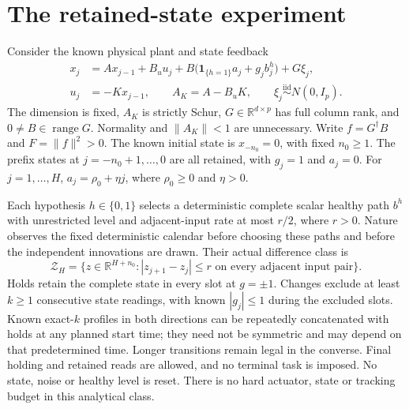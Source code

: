 \section{The retained-state experiment}\label{sf:model}
Consider the known physical plant and state feedback
\begin{equation}\label{sf:plant}
\begin{split}
x_j&=Ax_{j-1}+B_u u_j+B\bigl(\mathbf1_{\{h=1\}}a_j+g_jb_j^h\bigr)+G\xi_j,\\
u_j&=-Kx_{j-1},\qquad A_K=A-B_uK,\qquad
\xi_j\overset{\mathrm{iid}}{\sim}N(0,I_p).
\end{split}
\end{equation}
The dimension is fixed, $A_K$ is strictly Schur, $G\in\mathbb R^{d\times p}$
has full column rank, and $0\ne B\in\operatorname{range}G$.
Normality and $\|A_K\|<1$ are unnecessary. Write
$f=G^\dagger B$ and $F=\|f\|^2>0$. The known initial state is
$x_{-n_0}=0$, with fixed $n_0\ge1$. The prefix states at
$j=-n_0+1,\ldots,0$ are all retained, with $g_j=1$ and $a_j=0$.
For $j=1,\ldots,H$, $a_j=\rho_0+\eta j$, where $\rho_0\ge0$ and $\eta>0$.

Each hypothesis $h\in\{0,1\}$ selects a deterministic complete scalar healthy
path $b^h$ with unrestricted level and adjacent-input rate at most $r/2$,
where $r>0$. Nature observes the fixed deterministic calendar before choosing
these paths and before the independent innovations are drawn. Their actual
difference class is
\begin{equation}\label{sf:path}
\mathcal Z_H=\{z\in\mathbb R^{H+n_0}:|z_{j+1}-z_j|\le r
\text{ on every adjacent input pair}\}.
\end{equation}
Holds retain the complete state in every slot at $g=\pm1$. Changes exclude
at least $k\ge1$ consecutive state readings, with known $|g_j|\le1$ during
the excluded slots. Known exact-$k$ profiles in both directions can be
repeatedly concatenated with holds at any planned start time; they need not
be symmetric and may depend on that predetermined time. Longer transitions
remain legal in the converse. Final holding and retained reads are allowed,
and no terminal task is imposed. No state, noise or healthy level is reset.
There is no hard actuator, state or tracking budget in this analytical class.

